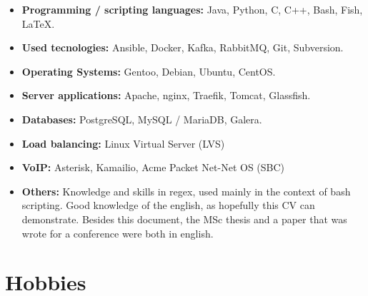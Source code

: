 \documentclass[11pt,a4paper,sans]{moderncv} %
\begin{document}
\begin{itemize}

\item \textbf{Programming / scripting languages:} Java, Python, C, C++, Bash, Fish, LaTeX. \\

\vspace{6pt}

\item \textbf{Used tecnologies:} Ansible, Docker, Kafka, RabbitMQ, Git,
  Subversion.
  
\vspace{6pt}

\item \textbf{Operating Systems:} Gentoo, Debian, Ubuntu, CentOS.

\vspace{6pt}

\item \textbf{Server applications:} Apache, nginx, Traefik, Tomcat, Glassfish.

\vspace{6pt}

\item \textbf{Databases:} PostgreSQL, MySQL / MariaDB, Galera.

\vspace{6pt}

\item \textbf{Load balancing:} Linux Virtual Server (LVS)

\vspace{6pt}

\item \textbf{VoIP:} Asterisk, Kamailio, Acme Packet Net-Net OS (SBC)

\vspace{6pt}

\item \textbf{Others: } Knowledge and skills in regex, used mainly in the
  context of bash scripting. Good knowledge of the english, as hopefully this CV
  can demonstrate. Besides this document, the MSc thesis and a paper that was
  wrote for a conference were both in english.

\end{itemize}

\section{Hobbies}

\vspace{6pt}
\end{document}
